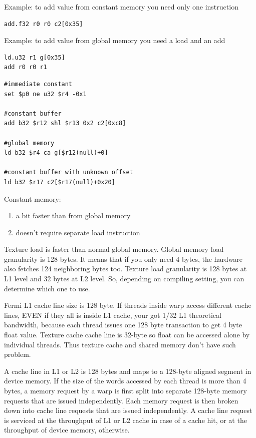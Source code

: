 Example: to add value from constant memory you need only one
instruction
\begin{lstlisting}
add.f32 r0 r0 c2[0x35]
\end{lstlisting}

Example: to add value from global memory you need a load and an add
\begin{lstlisting}
ld.u32 r1 g[0x35]
add r0 r0 r1
\end{lstlisting}

\begin{lstlisting}
#immediate constant
set $p0 ne u32 $r4 -0x1

#constant buffer
add b32 $r12 shl $r13 0x2 c2[0xc8]

#global memory
ld b32 $r4 ca g[$r12(null)+0]

#constant buffer with unknown offset
ld b32 $r17 c2[$r17(null)+0x20]
\end{lstlisting}

Constant memory:
\begin{enumerate}
\item a bit faster than from global memory
\item doesn't require separate load instruction
\end{enumerate}

Texture load is faster than normal global memory. Global memory load
granularity is 128 bytes. It means that if you only need 4 bytes, the
hardware also fetches 124 neighboring bytes too. Texture load
granularity is 128 bytes at L1 level and 32 bytes at L2 level. So,
depending on compiling setting, you can determine which one to use. 

Fermi L1 cache line size is 128 byte. If threads inside warp access
different cache lines, EVEN if they all is inside L1 cache, your got
1/32 L1 theoretical bandwidth, because each thread issues one 128 byte
transaction to get 4 byte float value.  Texture cache cache line is
32-byte so float can be accessed alone by individual threads.  Thus
texture cache and shared memory don't have such problem.

A cache line in L1 or L2 is 128 bytes and maps to a 128-byte aligned
segment in device memory.  If the size of the words accessed by each
thread is more than 4 bytes, a memory request by a warp is first split
into separate 128-byte memory requests that are issued independently.
Each memory request is then broken down into cache line requests that
are issued independently. A cache line request is serviced at the
throughput of L1 or L2 cache in case of a cache hit, or at the
throughput of device memory, otherwise.


